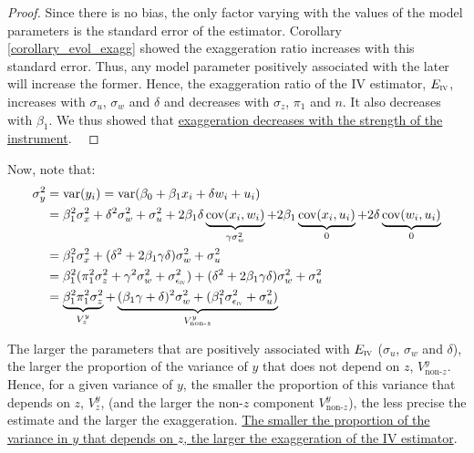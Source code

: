 \documentclass[a4paper, 11pt]{report}
\begin{document}
			\begin{proof}
				Since there is no bias, the only factor varying with the values of the model parameters is the standard error of the estimator. Corollary \ref{corollary_evol_exagg} showed the exaggeration ratio increases with this standard error. Thus, any model parameter positively associated with the later will increase the former. Hence, the exaggeration ratio of the IV estimator, $E_{\textsc{iv}}$, increases with $\sigma_{u}$, $\sigma_{w}$ and $\delta$ and decreases with $\sigma_{z}$, $\pi_{1}$ and $n$. It also decreases with $\beta_{1}$. We thus showed that \ul{exaggeration decreases with the strength of the instrument}. 
			~
			\end{proof}
				
				Now, note that:
				~
				\begin{align*}
					\sigma_{y}^{2} & =  \text{var}(y_{i}) = \text{var}(\beta_{0} + \beta_{1}x_{i} + \delta w_{i} + u_{i})\\
						& = \beta_{1}^{2}\sigma_{x}^{2} + \delta^{2}\sigma_{w}^{2} + \sigma_{u}^{2} + 2\beta_{1}\delta \underbrace{\text{cov}(x_{i}, w_{i})}_{\gamma \sigma_{w}^{2}} + 2 \beta_{1}  \underbrace{\text{cov}(x_{i}, u_{i})}_{0} + 2\delta \underbrace{\text{cov}(w_{i}, u_{i})}_{0} \\
						& = \beta_{1}^{2}\sigma_{x}^{2} + (\delta^{2} + 2\beta_{1}\gamma\delta)\sigma_{w}^{2} + \sigma_{u}^{2}\\
						& = \beta_{1}^{2}(\pi_{1}^{2}\sigma_{z}^{2} + \gamma^{2}\sigma_{w}^{2} + \sigma_{\epsilon_{\textsc{iv}}}^{2}) + (\delta^{2} + 2\beta_{1}\gamma\delta)\sigma_{w}^{2} + \sigma_{u}^{2}\\
						& = \underbrace{\beta_{1}^{2}\pi_{1}^{2}\sigma_{z}^{2}}_{V_{z}^{y}} + \underbrace{(\beta_{1}\gamma + \delta)^{2}\sigma_{w}^{2} + (\beta_{1}^{2}\sigma_{\epsilon_{\textsc{iv}}}^{2} + \sigma_{u}^{2})}_{V_{\text{non-}z}^{y}}
				\end{align*}
				
				The larger the parameters that are positively associated with $E_{\textsc{iv}}$ ($\sigma_{u}$, $\sigma_{w}$ and $\delta$), the larger the proportion of the variance of $y$ that does not depend on $z$, $V_{\text{non-}z}^{y}$. Hence, for a given variance of $y$, the smaller the proportion of  this variance that depends on $z$, $V_{z}^{y}$, (and the larger the non-$z$ component $V_{\text{non-}z}^{y}$), the less precise the estimate and the larger the exaggeration. \ul{The smaller the proportion of the variance in $y$ that depends on $z$, the larger the exaggeration of the IV estimator}.\\
				
\end{document}
